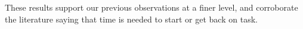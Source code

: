 \documentclass[times]{smrauth}
\begin{document}
These results support our previous observations at a finer level, and corroborate the literature saying that time is needed to start or get back on task.


\end{document}
